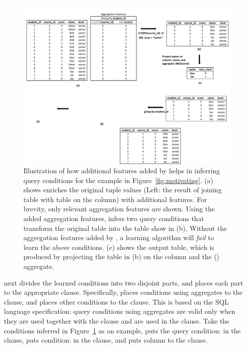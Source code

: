 \begin{figure}[t]
  \centering
  \includegraphics[scale=0.65]{fullexample}
  \vspace*{-3.0ex}\caption {{\label{fig:fullexample}
  Illustration of how additional features added by \ourtool
  helps in inferring query conditions for the example in Figure~\ref{fig:motivating}.
  (a) shows \ourtool
  enriches the original tuple values (Left: the
  result of joining table  with table
   on the  column)
  with additional features. For brevity, only relevant
  aggregation features are shown. Using the added aggregation
  features, \ourtool infers two query conditions that
  transform the original table into the table show in (b).
  Without the aggregation features added by
  \ourtool, a learning algorithm will \textit{fail} to learn the above conditions.
  (c) shows the output table, which is produced by projecting the
   table in (b)
  on the  column and the () aggregate.}}

\end{figure}


\ourtool next divides the learned conditions into two disjoint parts,
and places each part to the appropriate clause.
Specifically, \ourtool places conditions
using aggregates to the 
clause, and places other conditions to the  clause.
This is based on the SQL language specification:
query conditions using aggregates are valid only when they
are used {together with} the  clause
and are used in the  clause.
Take the conditions inferred in Figure~\ref{fig:fullexample}
as an example, \ourtool puts the query
condition: 
in the  clause,
puts condition: 
in the  clause, and puts 
column  to the  clause.




